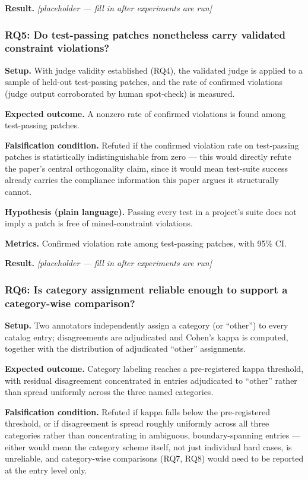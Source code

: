 \documentclass[11pt]{article}
\newcommand{\ph}{\textit{[placeholder --- fill in after experiments are run]}}
\begin{document}
\textbf{Result.} \ph

\subsubsection{RQ5: Do test-passing patches nonetheless carry validated constraint violations?}
\textbf{Setup.} With judge validity established (RQ4), the validated judge is applied to a sample of held-out test-passing patches, and the rate of confirmed violations (judge output corroborated by human spot-check) is measured.

\textbf{Expected outcome.} A nonzero rate of confirmed violations is found among test-passing patches.

\textbf{Falsification condition.} Refuted if the confirmed violation rate on test-passing patches is statistically indistinguishable from zero --- this would directly refute the paper's central orthogonality claim, since it would mean test-suite success already carries the compliance information this paper argues it structurally cannot.

\textbf{Hypothesis (plain language).} Passing every test in a project's suite does not imply a patch is free of mined-constraint violations.

\textbf{Metrics.} Confirmed violation rate among test-passing patches, with 95\% CI.

\textbf{Result.} \ph

\subsubsection{RQ6: Is category assignment reliable enough to support a category-wise comparison?}
\textbf{Setup.} Two annotators independently assign a category (or ``other'') to every catalog entry; disagreements are adjudicated and Cohen's kappa is computed, together with the distribution of adjudicated ``other'' assignments.

\textbf{Expected outcome.} Category labeling reaches a pre-registered kappa threshold, with residual disagreement concentrated in entries adjudicated to ``other'' rather than spread uniformly across the three named categories.

\textbf{Falsification condition.} Refuted if kappa falls below the pre-registered threshold, or if disagreement is spread roughly uniformly across all three categories rather than concentrating in ambiguous, boundary-spanning entries --- either would mean the category scheme itself, not just individual hard cases, is unreliable, and category-wise comparisons (RQ7, RQ8) would need to be reported at the entry level only.
\end{document}
